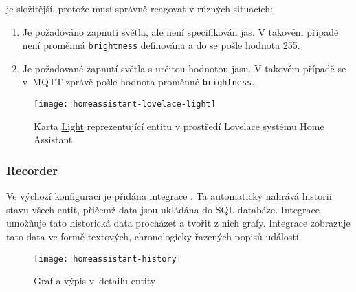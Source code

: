  je složitější, protože musí správně reagovat
v různých situacích:
\begin{enumerate}[nosep]
    \item Je požadováno zapnutí světla, ale není specifikován jas. V takovém
        případě není proměnná \texttt{brightness} definována a do
         se pošle hodnota \num{255}.
    \item Je požadované zapnutí světla s určitou hodnotou jasu. V takovém
        případě se v~MQTT zprávě pošle hodnota proměnné \texttt{brightness}.
\end{enumerate}

\begin{figure}[htb]
    \centering
    \texttt{[image: homeassistant-lovelace-light]}
    \caption{%
        Karta \href{https://www.home-assistant.io/lovelace/light/}{Light}
        reprezentující entitu  v prostředí
        Lovelace systému Home Assistant
    }
    \label{fig:homeassistant lovelace light}
\end{figure}


\subsubsection{Recorder}
Ve výchozí konfiguraci je přidána integrace . Ta
automaticky nahrává historii stavu všech entit, přičemž data jsou ukládána do
SQL databáze. Integrace  umožňuje tato historická data
procházet a tvořit z nich grafy. Integrace  zobrazuje
tato data ve formě textových, chronologicky řazených popisů událostí.

\begin{figure}[htb]
    \centering
    \texttt{[image: homeassistant-history]}
    \caption{%
        Graf  a výpis  v~detailu
        entity 
    }
    \label{fig:homeassistant lovelace light history}
\end{figure}
